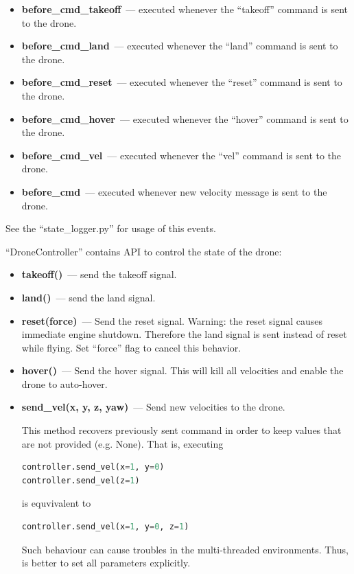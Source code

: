 \documentclass[12pt]{article}
\begin{document}
\begin{itemize}
        \item {\bf before\_cmd\_takeoff}~--- executed whenever the ``takeoff'' command is sent
          to the drone.
        \item {\bf before\_cmd\_land}~--- executed whenever the ``land'' command is sent
          to the drone.
        \item {\bf before\_cmd\_reset}~--- executed whenever the ``reset'' command is sent
          to the drone.
        \item {\bf before\_cmd\_hover}~--- executed whenever the ``hover'' command is sent
          to the drone.
        \item {\bf before\_cmd\_vel}~--- executed whenever the ``vel'' command is sent
          to the drone.
        \item {\bf before\_cmd}~--- executed whenever new velocity message is sent
          to the drone.

    \end{itemize}

    See the ``state\_logger.py'' for usage of this events.

    ``DroneController'' contains API to control the state of the drone:

    \begin{itemize}
        \item {\bf takeoff()}~--- send the takeoff signal.
    
        \item {\bf land()}~--- send the land signal.
    
        \item {\bf reset(force)}~--- Send the reset signal.
        Warning: the reset signal causes immediate engine shutdown.
        Therefore the land signal is sent instead of reset while flying.
        Set ``force'' flag to cancel this behavior.

        \item {\bf hover()}~--- Send the hover signal.
        This will kill all velocities and enable the drone to auto-hover.

        \item {\bf send\_vel(x, y, z, yaw)}~--- Send new velocities to the drone.

        This method recovers previously sent command in order to
        keep values that are not provided (e.g. None).
        That is, executing

    \begin{lstlisting}[frame=single,language=Python]
controller.send_vel(x=1, y=0)
controller.send_vel(z=1)
    \end{lstlisting}

        is equvivalent to

    \begin{lstlisting}[frame=single,language=Python]
controller.send_vel(x=1, y=0, z=1)
    \end{lstlisting}

        Such behaviour can cause troubles in the multi-threaded environments.
        Thus, is better to set all parameters explicitly.

    \end{itemize}
\end{document}
